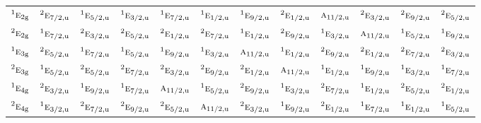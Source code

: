 \documentclass[10pt,a4paper]{article}
\numberwithin{equation}{section}
\newcommand{\irr}[1]{\text{\normalfont\scshape #1}}
\newcommand{\conjpair}[1]{{}^{#1}}
\newcommand{\ptag}[1]{\mathrm{#1}}
\begin{document}
{\begin{longtable}{@{}lccccccccccc@{}}
$\conjpair{1}\irr{e}_{2\ptag{g}}$ & $\conjpair{2}\irr{e}_{7/2,\ptag{u}}$ & $\conjpair{1}\irr{e}_{5/2,\ptag{u}}$ & $\conjpair{1}\irr{e}_{3/2,\ptag{u}}$ & $\conjpair{1}\irr{e}_{7/2,\ptag{u}}$ & $\conjpair{1}\irr{e}_{1/2,\ptag{u}}$ & $\conjpair{1}\irr{e}_{9/2,\ptag{u}}$ & $\conjpair{2}\irr{e}_{1/2,\ptag{u}}$ & $\irr{a}_{11/2,\ptag{u}}$ & $\conjpair{2}\irr{e}_{3/2,\ptag{u}}$ & $\conjpair{2}\irr{e}_{9/2,\ptag{u}}$ & $\conjpair{2}\irr{e}_{5/2,\ptag{u}}$\\
$\conjpair{2}\irr{e}_{2\ptag{g}}$ & $\conjpair{1}\irr{e}_{7/2,\ptag{u}}$ & $\conjpair{2}\irr{e}_{3/2,\ptag{u}}$ & $\conjpair{2}\irr{e}_{5/2,\ptag{u}}$ & $\conjpair{2}\irr{e}_{1/2,\ptag{u}}$ & $\conjpair{2}\irr{e}_{7/2,\ptag{u}}$ & $\conjpair{1}\irr{e}_{1/2,\ptag{u}}$ & $\conjpair{2}\irr{e}_{9/2,\ptag{u}}$ & $\conjpair{1}\irr{e}_{3/2,\ptag{u}}$ & $\irr{a}_{11/2,\ptag{u}}$ & $\conjpair{1}\irr{e}_{5/2,\ptag{u}}$ & $\conjpair{1}\irr{e}_{9/2,\ptag{u}}$\\
$\conjpair{1}\irr{e}_{3\ptag{g}}$ & $\conjpair{2}\irr{e}_{5/2,\ptag{u}}$ & $\conjpair{1}\irr{e}_{7/2,\ptag{u}}$ & $\conjpair{1}\irr{e}_{5/2,\ptag{u}}$ & $\conjpair{1}\irr{e}_{9/2,\ptag{u}}$ & $\conjpair{1}\irr{e}_{3/2,\ptag{u}}$ & $\irr{a}_{11/2,\ptag{u}}$ & $\conjpair{1}\irr{e}_{1/2,\ptag{u}}$ & $\conjpair{2}\irr{e}_{9/2,\ptag{u}}$ & $\conjpair{2}\irr{e}_{1/2,\ptag{u}}$ & $\conjpair{2}\irr{e}_{7/2,\ptag{u}}$ & $\conjpair{2}\irr{e}_{3/2,\ptag{u}}$\\
$\conjpair{2}\irr{e}_{3\ptag{g}}$ & $\conjpair{1}\irr{e}_{5/2,\ptag{u}}$ & $\conjpair{2}\irr{e}_{5/2,\ptag{u}}$ & $\conjpair{2}\irr{e}_{7/2,\ptag{u}}$ & $\conjpair{2}\irr{e}_{3/2,\ptag{u}}$ & $\conjpair{2}\irr{e}_{9/2,\ptag{u}}$ & $\conjpair{2}\irr{e}_{1/2,\ptag{u}}$ & $\irr{a}_{11/2,\ptag{u}}$ & $\conjpair{1}\irr{e}_{1/2,\ptag{u}}$ & $\conjpair{1}\irr{e}_{9/2,\ptag{u}}$ & $\conjpair{1}\irr{e}_{3/2,\ptag{u}}$ & $\conjpair{1}\irr{e}_{7/2,\ptag{u}}$\\
$\conjpair{1}\irr{e}_{4\ptag{g}}$ & $\conjpair{2}\irr{e}_{3/2,\ptag{u}}$ & $\conjpair{1}\irr{e}_{9/2,\ptag{u}}$ & $\conjpair{1}\irr{e}_{7/2,\ptag{u}}$ & $\irr{a}_{11/2,\ptag{u}}$ & $\conjpair{1}\irr{e}_{5/2,\ptag{u}}$ & $\conjpair{2}\irr{e}_{9/2,\ptag{u}}$ & $\conjpair{1}\irr{e}_{3/2,\ptag{u}}$ & $\conjpair{2}\irr{e}_{7/2,\ptag{u}}$ & $\conjpair{1}\irr{e}_{1/2,\ptag{u}}$ & $\conjpair{2}\irr{e}_{5/2,\ptag{u}}$ & $\conjpair{2}\irr{e}_{1/2,\ptag{u}}$\\
$\conjpair{2}\irr{e}_{4\ptag{g}}$ & $\conjpair{1}\irr{e}_{3/2,\ptag{u}}$ & $\conjpair{2}\irr{e}_{7/2,\ptag{u}}$ & $\conjpair{2}\irr{e}_{9/2,\ptag{u}}$ & $\conjpair{2}\irr{e}_{5/2,\ptag{u}}$ & $\irr{a}_{11/2,\ptag{u}}$ & $\conjpair{2}\irr{e}_{3/2,\ptag{u}}$ & $\conjpair{1}\irr{e}_{9/2,\ptag{u}}$ & $\conjpair{2}\irr{e}_{1/2,\ptag{u}}$ & $\conjpair{1}\irr{e}_{7/2,\ptag{u}}$ & $\conjpair{1}\irr{e}_{1/2,\ptag{u}}$ & $\conjpair{1}\irr{e}_{5/2,\ptag{u}}$\\

\end{longtable}}
\end{document}
